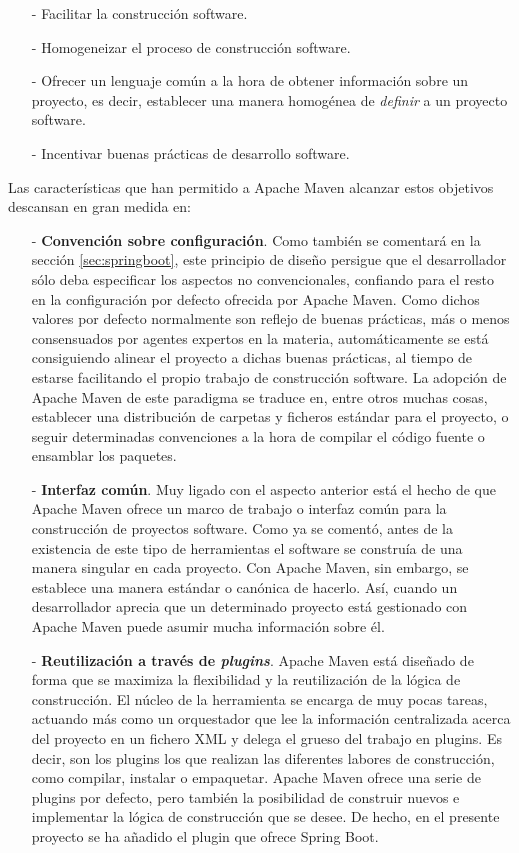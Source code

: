 \documentclass[a4paper]{article}
\begin{document}
	\begin{itemize}
		\item[-] Facilitar la construcción software.
		\item[-] Homogeneizar el proceso de construcción software.
		\item[-] Ofrecer un lenguaje común a la hora de obtener información sobre un proyecto, es decir, establecer una manera homogénea de \emph{definir} a un proyecto software.
		\item[-] Incentivar buenas prácticas de desarrollo software.
	\end{itemize}
	
	Las características que han permitido a Apache Maven alcanzar estos objetivos descansan en gran medida en:
	
	\begin{itemize}
		\item[-] \textbf{Convención sobre configuración}. Como también se comentará en la sección \ref{sec:springboot}, este principio de diseño persigue que el desarrollador sólo deba especificar los aspectos no convencionales, confiando para el resto en la configuración por defecto ofrecida por Apache Maven. Como dichos valores por defecto normalmente son reflejo de buenas prácticas, más o menos consensuados por agentes expertos en la materia, automáticamente se está consiguiendo alinear el proyecto a dichas buenas prácticas, al tiempo de estarse facilitando el propio trabajo de construcción software. La adopción de Apache Maven de este paradigma se traduce en, entre otros muchas cosas, establecer una distribución de carpetas y ficheros estándar para el proyecto, o seguir determinadas convenciones a la hora de compilar el código fuente o ensamblar los paquetes.
		\item[-] \textbf{Interfaz común}. Muy ligado con el aspecto anterior está el hecho de que Apache Maven ofrece un marco de trabajo o interfaz común para la construcción de proyectos software. Como ya se comentó, antes de la existencia de este tipo de herramientas el software se construía de una manera singular en cada proyecto. Con Apache Maven, sin embargo, se establece una manera estándar o canónica de hacerlo. Así, cuando un desarrollador aprecia que un determinado proyecto está gestionado con Apache Maven puede asumir mucha información sobre él.
		\item[-] \textbf{Reutilización a través de \emph{plugins}}. Apache Maven está diseñado de forma que se maximiza la flexibilidad y la reutilización de la lógica de construcción. El núcleo de la herramienta se encarga de muy pocas tareas, actuando más como un orquestador que lee la información centralizada acerca del proyecto en un fichero XML y delega el grueso del trabajo en plugins. Es decir, son los plugins los que realizan las diferentes labores de construcción, como compilar, instalar o empaquetar. Apache Maven ofrece una serie de plugins por defecto, pero también la posibilidad de construir nuevos e implementar la lógica de construcción que se desee. De hecho, en el presente proyecto se ha añadido el plugin que ofrece Spring Boot.

\end{itemize}
\end{document}
